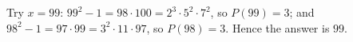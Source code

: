 Try $x=99$: $99^2-1=98\cdot100=2^3\cdot5^2\cdot7^2$, so $P(99)=3$; and $98^2-1=97\cdot99=3^2\cdot11\cdot97$, so $P(98)=3$. Hence the answer is $\boxed{99}$.
